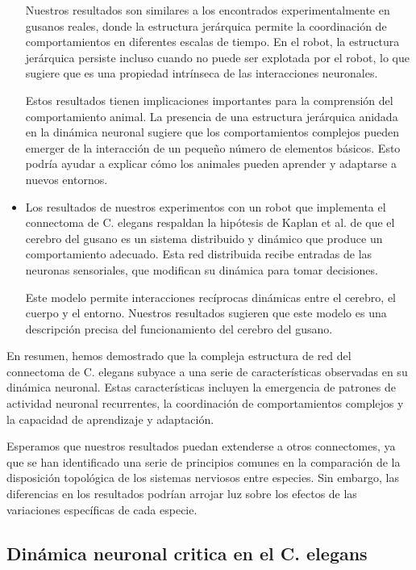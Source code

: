 \begin{itemize}
	Nuestros resultados son similares a los encontrados experimentalmente en gusanos
	reales, donde la estructura jerárquica permite la coordinación de
	comportamientos en diferentes escalas de tiempo. En el robot, la estructura
	jerárquica persiste incluso cuando no puede ser explotada por el robot, lo que
	sugiere que es una propiedad intrínseca de las interacciones neuronales.
	
	Estos resultados tienen implicaciones importantes para la comprensión del
	comportamiento animal. La presencia de una estructura jerárquica anidada en la
	dinámica neuronal sugiere que los comportamientos complejos pueden emerger de la
	interacción de un pequeño número de elementos básicos. Esto podría ayudar a
	explicar cómo los animales pueden aprender y adaptarse a nuevos entornos.
	
	\item Los resultados de nuestros experimentos con un robot que implementa el
	connectoma de C. elegans respaldan la hipótesis de Kaplan et al. de que el
	cerebro del gusano es un sistema distribuido y dinámico que produce un
	comportamiento adecuado. Esta red distribuida recibe entradas de las neuronas
	sensoriales, que modifican su dinámica para tomar decisiones.
	
	Este modelo permite interacciones recíprocas dinámicas entre el cerebro, el
	cuerpo y el entorno. Nuestros resultados sugieren que este modelo es una
	descripción precisa del funcionamiento del cerebro del gusano.
	
\end{itemize}


En resumen, hemos demostrado que la compleja estructura de red del connectoma de
C. elegans subyace a una serie de características observadas en su dinámica
neuronal. Estas características incluyen la emergencia de patrones de actividad
neuronal recurrentes, la coordinación de comportamientos complejos y la
capacidad de aprendizaje y adaptación.

Esperamos que nuestros resultados puedan extenderse a otros connectomes, ya que
se han identificado una serie de principios comunes en la comparación de la
disposición topológica de los sistemas nerviosos entre especies. Sin embargo,
las diferencias en los resultados podrían arrojar luz sobre los efectos de las
variaciones específicas de cada especie.



\subsection{Dinámica neuronal critica en el C. elegans}

